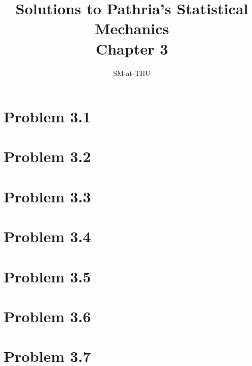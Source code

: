 \documentclass{article}
\author{SM-at-THU}
\title{\bf{Solutions to Pathria's Statistical Mechanics}\\Chapter 3}
\begin{document}
\maketitle

\section*{Problem 3.1}

\section*{Problem 3.2}

\section*{Problem 3.3}

\section*{Problem 3.4}

\section*{Problem 3.5}

\section*{Problem 3.6}

\section*{Problem 3.7}
\end{document}
